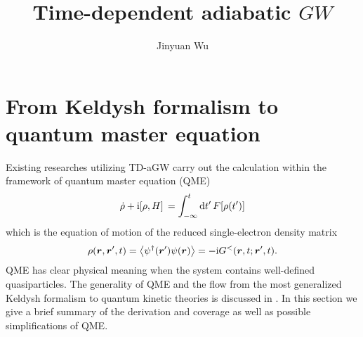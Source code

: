 \documentclass[hyperref, a4paper]{article}
\title{Time-dependent adiabatic $GW$}
\author{Jinyuan Wu}
\newcommand*{\ii}{\mathrm{i}}
\begin{document}
\maketitle

\section{From Keldysh formalism to quantum master equation}

Existing researches \cite{chan2021giant} utilizing TD-aGW carry out the calculation 
within the framework of quantum master equation (QME)
\begin{equation}
    \dot{\rho} + \ii \comm*{\rho}{H} = \int_{-\infty}^{t} \dd{t'} F[\rho(t')]
\end{equation}
which is the equation of motion of the 
reduced single-electron density matrix 
\begin{equation}
    \rho(\vb*{r}, \vb*{r}', t) = \expval{\psi^\dagger(\vb*{r}') \psi(\vb*{r})}
    = - \ii G^<(\vb*{r}, t; \vb*{r}', t).
\end{equation}
QME has clear physical meaning 
when the system contains well-defined quasiparticles.
The generality of QME and the flow from the most generalized Keldysh formalism 
to quantum kinetic theories is discussed in 
\cite{rammer1986quantum,vspivcka2005long,vspivcka2005long2,vspivcka2005long3}.
In this section we give a brief summary of the derivation 
and coverage as well as possible simplifications of QME.
\end{document}
